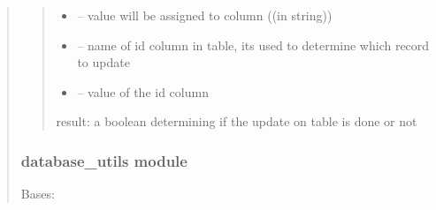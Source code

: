 \documentclass[letterpaper,10pt,english]{sphinxmanual}
\begin{document}
\begin{quote}
\begin{savenotes}
\begin{fulllineitems}
\begin{savenotes}
\begin{fulllineitems}
\begin{quote}
\begin{description}
\begin{itemize}
\item {} 
\sphinxAtStartPar
{} – value will be assigned to column ((in string))

\item {} 
\sphinxAtStartPar
{} – name of id column in table, its used to determine which record to update

\item {} 
\sphinxAtStartPar
{} – value of the id column

\end{itemize}

\sphinxAtStartPar
result: a boolean determining if the update on table is done or not

\end{description}\end{quote}

\end{fulllineitems}\end{savenotes}


\end{fulllineitems}\end{savenotes}


\sphinxstepscope


\subsubsection{database\_utils module}
\label{\detokenize{setting/database_utils:module-oxin.database_utils}}\label{\detokenize{setting/database_utils:database-utils-module}}\label{\detokenize{setting/database_utils::doc}}

\begin{savenotes}\begin{fulllineitems}
\label{\detokenize{setting/database_utils:oxin.database_utils.dataBaseUtils}}
\pysigstartsignatures
{}
\pysigstopsignatures
\sphinxAtStartPar
Bases: 


\end{fulllineitems}
\end{savenotes}
\end{quote}
\end{document}
